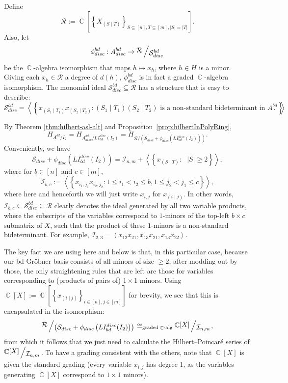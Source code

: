 \documentclass[11pt,reqno]{amsart}
\DeclareMathOperator{\C}{\mathbb{C}}
\newcommand{\suchthat}{:}
\newcommand{\ideal}[1]{\left\langle#1\right\rangle}
\newcommand{\bigslant}[2]{{\raisebox{.2em}{$#1$}\left/\raisebox{-.2em}{$#2$}\right.}}
\newcommand{\bidet}[2]{(#1\;|\;#2)}
\theoremstyle{definition}
\numberwithin{equation}{section}
\begin{document}
Define 
\[
\mathcal{R} := \C\left[\left\{X_{\bidet{S}{T}}\right\}_{S \subseteq [n], T \subseteq [m], |S| = |T|}\right].
\]
Also, let
\[
\phi_{disc}^{bd}: A_{disc}^{bd} \rightarrow \bigslant{\mathcal{R}}{\mathcal{S}_{disc}^{bd}}
\]
be the $\C$-algebra isomorphism that maps $h \mapsto x_h$, where $h \in H$ is a minor. Giving each $x_h \in \mathcal{R}$ a degree of $d(h)$, $\phi_{disc}^{bd}$ is in fact a graded $\C$-algebra isomorphism. The monomial ideal $\mathcal{S}^{bd}_{disc} \subseteq \mathcal{R}$ has a structure that is easy to describe:
\[\mathcal{S}^{bd}_{disc} = \ideal{\left\{x_{\bidet{S_1}{T_1}}x_{\bidet{S_2}{T_2}} \suchthat \bidet{S_1}{T_1}\bidet{S_2}{T_2} \text{ is a non-standard bideterminant in }A^{bd}\right\}}.\]

By Theorem \ref{thm:hilbert-asl-alt} and Proposition~\ref{prop:hilbertInPolyRing},
\[
H_{A^{bd} / I_2} = H_{A^{bd}_{disc} / LI_{bd}^{disc}(I_2)} = H_{\mathcal{R} / \left(\mathcal{S}_{disc} + \phi_{disc}\left(LI_{bd}^{disc}(I_2)\right)\right)}.
\] 
Conveniently, we have 
\[
\mathcal{S}_{disc} + \phi_{disc}\left(LI_{bd}^{disc}(I_2)\right) = \mathcal{I}_{n, m} + \ideal{\left\{x_{\bidet{S}{T}} \suchthat \text{ $|S| \ge 2$}\right\}},
\] 
where for $b \in [n]$ and $c \in [m]$, 
\begin{equation} 
\label{eqn:I-rank-1-adisc} 
\mathcal{I}_{b, c} := \ideal{\left\{x_{i_1,j_1}x_{i_2,j_2} \suchthat 1 \le i_1 < i_2 \le b, 1 \le j_2 < j_1 \le c\right\}},
\end{equation} 
where here and henceforth we will just write $x_{i, j}$ for $x_{\bidet{i}{j}}$. In other words, $\mathcal{I}_{b, c} \subseteq \mathcal{S}^{bd}_{disc} \subseteq \mathcal{R}$ clearly denotes the ideal generated by all two variable products, where the subscripts of the variables correspond to $1$-minors of the top-left $b \times c$ submatrix of $X$, such that the product of these $1$-minors is a non-standard bideterminant. For example, $\mathcal{I}_{2,3} = \ideal{x_{12}x_{21}, x_{13}x_{21}, x_{13}x_{22}}$. 

The key fact we are using here and below is that, in this particular case, because our bd-Gröbner basis consists of all minors of size $\geq 2$, after modding out by those, the only straightening rules that are left are those for variables corresponding to (products of pairs of) $1 \times 1$ minors. Using $\C[X] := \C\left[\left\{x_{\bidet{i}{j}}\right\}_{i \in [n], j \in [m]}\right]$ for brevity, we see that this is encapsulated in the isomorphism:
\[
\bigslant{\mathcal{R}}{\left(\mathcal{S}_{disc} + \phi_{disc}\left(LI_{bd}^{disc}(I_2)\right)\right)} \cong_{\text{graded $\C$-alg}} \bigslant{\C[X]}{\mathcal{I}_{n, m}},
\]
from which it follows that we just need to calculate the Hilbert--Poincar\'e series of $\bigslant{\C[X]}{\mathcal{I}_{n, m}}$. To have a grading consistent with the others, note that $\C[X]$ is given the standard grading (every variable $x_{i,j}$ has degree 1, as the variables generating $\C[X]$ correspond to $1 \times 1$ minors).	
\end{document}
